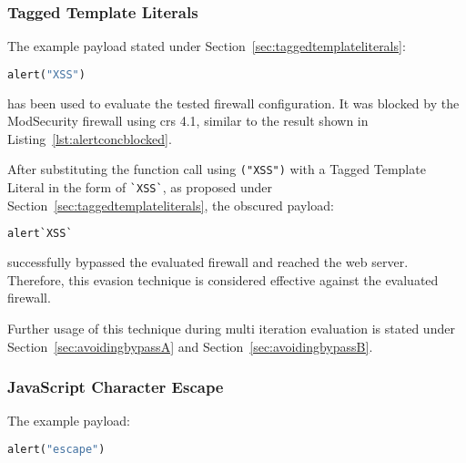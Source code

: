 \subsubsection{Tagged Template Literals}
\label{sec:taggedtemplateliteralsevaluation}
The example payload stated under Section~\ref{sec:taggedtemplateliterals}:

\begin{lstlisting}[style=basicStyle, language=Python]
alert("XSS")
\end{lstlisting}

has been used to evaluate the tested firewall configuration. It was blocked by the ModSecurity firewall using \acrshort{crs} 4.1, similar to the result shown in Listing~\ref{lst:alertconcblocked}.

%

After substituting the function call using \verb|("XSS")| with a Tagged Template Literal in the form of \verb|`XSS`|, as proposed under Section~\ref{sec:taggedtemplateliterals}, the obscured payload:

\begin{lstlisting}[style=basicStyle, language=Python, caption=alert`XSS` bypass, label=lst:alertXSSbypass]
alert`XSS`
\end{lstlisting}

successfully bypassed the evaluated firewall and reached the web server. Therefore, this evasion technique is considered effective against the evaluated firewall.

Further usage of this technique during multi iteration evaluation is stated under Section~\ref{sec:avoidingbypassA} and Section~\ref{sec:avoidingbypassB}.

\subsubsection{JavaScript Character Escape}
\label{sec:jsescapesingleiter}
The example payload:

\begin{lstlisting}[style=basicStyle, language=Python]
alert("escape")
\end{lstlisting}

